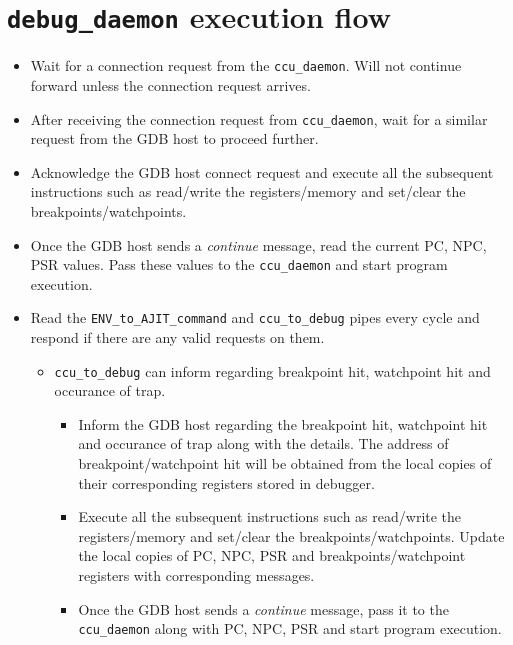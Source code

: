 \documentclass[a4paper, 11pt]{article}
\begin{document}
\section{\texttt{debug\_daemon} execution flow}
\label{sec:execution}
\begin{itemize}
\item Wait for a connection request from the \texttt{ccu\_daemon}. Will not continue forward unless the connection request arrives.

\item After receiving the connection request from \texttt{ccu\_daemon}, wait for a similar request from the GDB host to proceed further.

\item Acknowledge the GDB host connect request and execute all the subsequent instructions such as read/write the registers/memory and set/clear the breakpoints/watchpoints.

\item Once the GDB host sends a \textit{continue} message, read the current PC, NPC, PSR values. Pass these values to the \texttt{ccu\_daemon} and start program execution.

\item Read the \texttt{ENV\_to\_AJIT\_command} and \texttt{ccu\_to\_debug} pipes every cycle and respond if there are any valid requests on them.
		\begin{itemize}
		\item \texttt{ccu\_to\_debug} can inform regarding breakpoint hit, watchpoint hit and occurance of trap.
		
				\begin{itemize}
				\item Inform the GDB host regarding the breakpoint hit, watchpoint hit and occurance of trap along with the details. The address of breakpoint/watchpoint hit will be obtained from the local copies of their corresponding registers stored in debugger.
				
				\item Execute all the subsequent instructions such as read/write the registers/memory and set/clear the breakpoints/watchpoints. Update the local copies of PC, NPC, PSR and breakpoints/watchpoint registers with corresponding messages.
				
				\item Once the GDB host sends a \textit{continue} message, pass it to the \texttt{ccu\_daemon} along with PC, NPC, PSR and start program execution.
				

\end{itemize}
\end{itemize}
\end{itemize}
\end{document}
